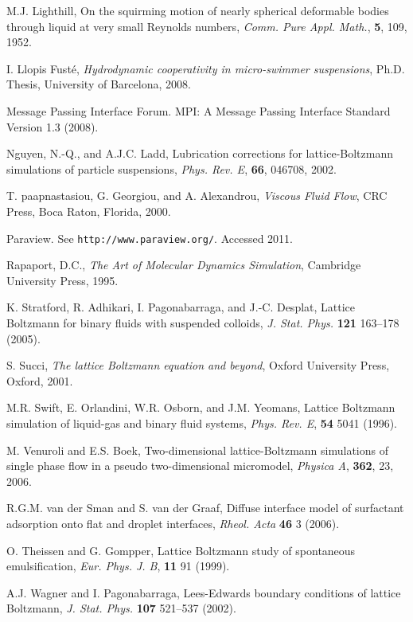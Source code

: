 \begin{thebibliography}{99}
M.J. Lighthill,
On the squirming motion of nearly spherical deformable bodies through
liquid at very small Reynolds numbers,
\textit{Comm. Pure Appl. Math.}, \textbf{5}, 109, 1952.

I. Llopis Fust\'e,
\textit{Hydrodynamic cooperativity in micro-swimmer suspensions},
Ph.D. Thesis, University of Barcelona, 2008.

Message Passing Interface Forum. MPI: A Message Passing Interface Standard
Version 1.3 (2008).

Nguyen, N.-Q., and A.J.C. Ladd, Lubrication corrections for
lattice-Boltzmann simulations of particle suspensions,
\textit{Phys. Rev. E}, \textbf{66}, 046708, 2002.

T. paapnastasiou, G. Georgiou, and A. Alexandrou,
\textit{Viscous Fluid Flow},
CRC Press, Boca Raton, Florida, 2000.

Paraview. See \texttt{http://www.paraview.org/}. Accessed 2011.

Rapaport, D.C., \textit{The Art of Molecular Dynamics Simulation},
Cambridge University Press, 1995.


K. Stratford, R. Adhikari, I. Pagonabarraga, and J.-C. Desplat,
Lattice Boltzmann for binary fluids with suspended colloids,
\textit{J. Stat. Phys.} \textbf{121} 163--178 (2005).

S. Succi, \textit{The lattice Boltzmann equation and beyond},
Oxford University Press, Oxford, 2001.

M.R. Swift, E. Orlandini, W.R. Osborn, and J.M. Yeomans,
Lattice Boltzmann simulation of liquid-gas and binary fluid systems,
\textit{Phys. Rev. E}, \textbf{54} 5041 (1996).

M. Venuroli and E.S. Boek,
Two-dimensional lattice-Boltzmann simulations of single phase
flow in a pseudo two-dimensional micromodel,
\textit{Physica A}, \textbf{362}, 23, 2006.

R.G.M. van der Sman and S. van der Graaf,
Diffuse interface model of surfactant adsorption onto flat and
droplet interfaces,
\textit{Rheol. Acta} \textbf{46} 3 (2006).

O. Theissen and G. Gompper,
Lattice Boltzmann study of spontaneous emulsification,
\textit{Eur. Phys. J. B}, \textbf{11} 91 (1999).

A.J. Wagner and I. Pagonabarraga,
Lees-Edwards boundary conditions of lattice Boltzmann,
\textit{J. Stat. Phys.} \textbf{107} 521--537 (2002).


\end{thebibliography}
